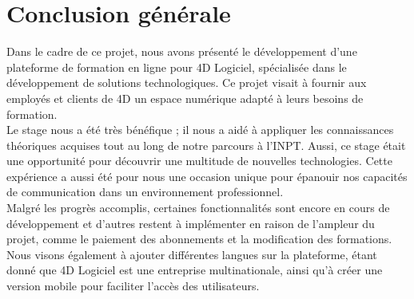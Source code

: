 \chapter*{Conclusion générale}

Dans le cadre de ce projet, nous avons présenté le développement d’une plateforme de formation en ligne pour 4D Logiciel, spécialisée dans le développement de solutions technologiques. Ce projet visait à fournir aux employés et clients de 4D un espace numérique adapté à leurs besoins de formation.\\

Le stage nous a été très bénéfique ; il nous a aidé à appliquer les connaissances théoriques
acquises tout au long de notre parcours à l’INPT. Aussi, ce stage était une opportunité pour
découvrir une multitude de nouvelles technologies. Cette expérience a aussi été pour nous une
occasion unique pour épanouir nos capacités de communication dans un environnement
professionnel.\\

Malgré les progrès accomplis, certaines fonctionnalités sont encore en cours de développement et d'autres restent à implémenter en raison de l'ampleur du projet, comme le paiement des abonnements et la modification des formations. Nous visons également à ajouter différentes langues sur la plateforme, étant donné que 4D Logiciel est une entreprise multinationale, ainsi qu'à créer une version mobile pour faciliter l'accès des utilisateurs.\\